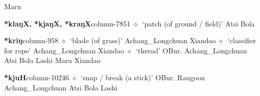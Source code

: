 \hspace{1ex}
         Maru 
  \item {\footnotesize \textbf{*klaŋX, *kjaŋX, *kraŋX}}{\tiny column-7851}
         $\diamond$~`patch (of ground / field)'
         Atsi 
\hspace{1ex}
         Bola 
  \item {\footnotesize \textbf{*kriŋ}}{\tiny column-958}
         $\diamond$~`blade (of grass)'
         Achang\_Longchuan 
\hspace{1ex}
         Xiandao 
\hspace{1ex}
         $\diamond$~`classifier for rope'
         Achang\_Longchuan 
\hspace{1ex}
         Xiandao 
\hspace{1ex}
         $\diamond$~`thread'
         OBur. 
\hspace{1ex}
         Achang\_Longchuan 
\hspace{1ex}
         Atsi 
\hspace{1ex}
         Bola 
\hspace{1ex}
         Lashi 
\hspace{1ex}
         Maru 
\hspace{1ex}
         Xiandao 
  \item {\footnotesize \textbf{*kjuH}}{\tiny column-10246}
         $\diamond$~`snap / break (a stick)'
         OBur. 
\hspace{1ex}
         Rangoon 
\hspace{1ex}
         Achang\_Longchuan 
\hspace{1ex}
         Atsi 
\hspace{1ex}
         Bola 
\hspace{1ex}
         Lashi 
\hspace{1ex}
